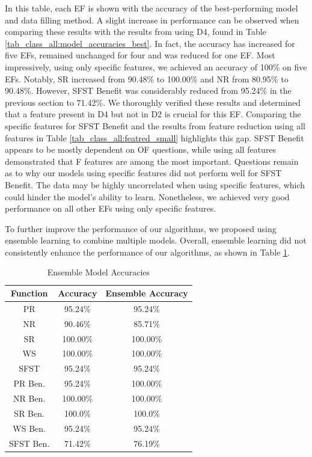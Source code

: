 \documentclass[12pt,letterpaper]{article}
\begin{document}
In this table, each \ac{EF} is shown with the accuracy of the best-performing model and data filling method.
A slight increase in performance can be observed when comparing these results with the results from using D4, found in Table \ref{tab_class_all:model_accuracies_best}.
In fact, the accuracy has increased for five \acp{EF}, remained unchanged for four and was reduced for one \ac{EF}.
Most impressively, using only specific features, we achieved an accuracy of 100\% on five \acp{EF}.
Notably, \ac{SR} increased from 90.48\% to 100.00\% and \ac{NR} from 80.95\% to 90.48\%.
However, \ac{SFST} Benefit was considerably reduced from 95.24\% in the previous section to 71.42\%.
We thoroughly verified these results and determined that a feature present in D4 but not in D2 is crucial for this \ac{EF}.
Comparing the specific features for \ac{SFST} Benefit and the results from feature reduction using all features in Table \ref{tab_class_all:featred_small} highlights this gap.
\ac{SFST} Benefit appears to be mostly dependent on \ac{OF} questions, while using all features demonstrated that \ac{F} features are among the most important.
Questions remain as to why our models using specific features did not perform well for \ac{SFST} Benefit.
The data may be highly uncorrelated when using specific features, which could hinder the model's ability to learn.
Nonetheless, we achieved very good performance on all other \acp{EF} using only specific features.

To further improve the performance of our algorithms, we proposed using ensemble learning to combine multiple models.
Overall, ensemble learning did not consistently enhance the performance of our algorithms, as shown in Table \ref{tab_class_specific:class_ensemble}.

\begin{table}[H]
\centering
\begin{tabular}{|c|c|c|}
\hline
\textbf{Function} & \textbf{Accuracy} & \textbf{Ensemble Accuracy} \\
\hline
PR      & 95.24\% & 95.24\% \\
\hline
NR      & 90.46\% & 85.71\%\\
\hline
SR      & 100.00\% & 100.00\%\\
\hline
WS      & 100.00\% & 100.00\%\\
\hline
SFST    & 95.24\% & 95.24\%\\
\hline
PR Ben. & 95.24\% & 100.00\%\\
\hline
NR Ben. & 100.00\% & 100.00\%\\
\hline
SR Ben. & 100.0\% & 100.0\%\\
\hline
WS Ben. & 95.24\% & 95.24\%\\
\hline
SFST Ben. & 71.42\% & 76.19\%\\
\hline
\end{tabular}
\caption{Ensemble Model Accuracies}
\label{tab_class_specific:class_ensemble}
\end{table}
\end{document}
